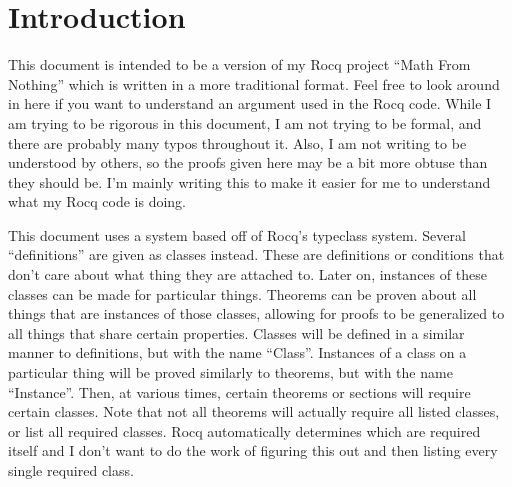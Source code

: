 \documentclass[../math.tex]{subfiles}
\begin{document}
\section*{Introduction}

This document is intended to be a version of my Rocq project ``Math From
Nothing'' which is written in a more traditional format.  Feel free to look
around in here if you want to understand an argument used in the Rocq code.
While I am trying to be rigorous in this document, I am not trying to be formal,
and there are probably many typos throughout it.  Also, I am not writing to be
understood by others, so the proofs given here may be a bit more obtuse than
they should be.  I'm mainly writing this to make it easier for me to understand
what my Rocq code is doing.

This document uses a system based off of Rocq's typeclass system.  Several
``definitions'' are given as classes instead.  These are definitions or
conditions that don't care about what thing they are attached to.  Later on,
instances of these classes can be made for particular things.  Theorems can be
proven about all things that are instances of those classes, allowing for proofs
to be generalized to all things that share certain properties.  Classes will be
defined in a similar manner to definitions, but with the name ``Class''.
Instances of a class on a particular thing will be proved similarly to theorems,
but with the name ``Instance''.  Then, at various times, certain theorems or
sections will require certain classes.  Note that not all theorems will actually
require all listed classes, or list all required classes.  Rocq automatically
determines which are required itself and I don't want to do the work of figuring
this out and then listing every single required class.
\end{document}
